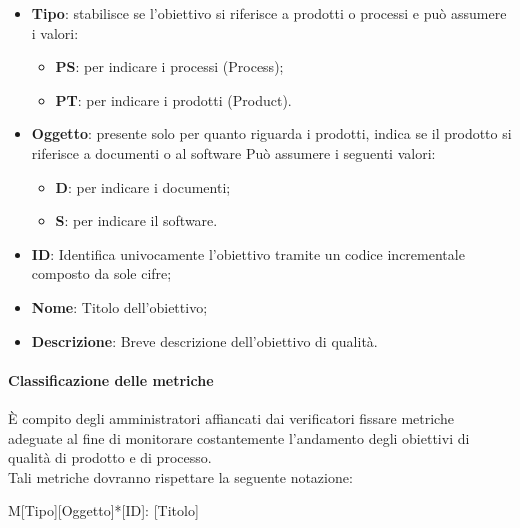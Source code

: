 \begin{itemize}
    \item \textbf{Tipo}: stabilisce se l'obiettivo si riferisce a prodotti o processi e può assumere i valori:
    \begin{itemize}
        \item \textbf{PS}: per indicare i processi (Process);
        \item \textbf{PT}: per indicare i prodotti (Product).
    \end{itemize}
    \item \textbf{Oggetto}: presente solo per quanto riguarda i prodotti, indica se il prodotto si riferisce a 
    documenti o al software Può assumere i seguenti valori:
    \begin{itemize}
        \item \textbf{D}: per indicare i documenti;
        \item \textbf{S}: per indicare il software.
    \end{itemize}
    \item \textbf{ID}: Identifica univocamente l'obiettivo tramite un codice incrementale composto da sole cifre;
    \item \textbf{Nome}: Titolo dell'obiettivo;
    \item \textbf{Descrizione}: Breve descrizione dell'obiettivo di qualità.
\end{itemize}


\paragraph{Classificazione delle metriche}
\MakeUppercase{è} compito degli amministratori affiancati dai verificatori fissare metriche adeguate al fine di monitorare 
costantemente l'andamento degli obiettivi di qualità di prodotto e di processo. \\
Tali metriche dovranno rispettare la seguente notazione:
\begin{center}
    M[Tipo][Oggetto]*[ID]: [Titolo]
\end{center}

